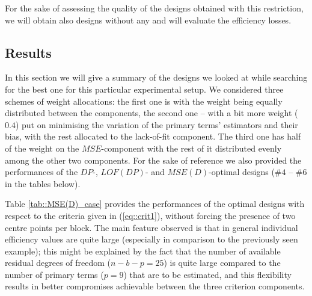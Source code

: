 For the sake of assessing the quality of the designs obtained with this restriction, we will obtain also designs without any and will evaluate the efficiency losses.

\subsection{Results}

In this section we will give a summary of the designs we looked at while searching for the best one for this particular experimental setup. We considered three schemes of weight allocations: the first one is with the weight being equally distributed between the components, the second one -- with a bit more weight ($0.4$) put on minimising the variation of the primary terms' estimators and their bias, with the rest allocated to the lack-of-fit component. The third one has half of the weight on the $MSE$-component with the rest of it distributed evenly among the other two components. For the sake of reference we also provided the performances of the $DP$-, $LOF(DP)$- and $MSE(D)$-optimal designs (\#$4$ -- \#$6$ in the tables below). 

Table \ref{tab::MSE(D)_case} provides the performances of the optimal designs with respect to the criteria given in (\ref{eq::crit1}), without forcing the presence of two centre points per block. The main feature observed is that in general individual efficiency values are quite large (especially in comparison to the previously seen example); this might be explained by the fact that the number of available residual degrees of freedom ($n-b-p=25$) is quite large compared to the number of primary terms ($p=9$) that are to be estimated, and this flexibility results in better compromises achievable between the three criterion components.


